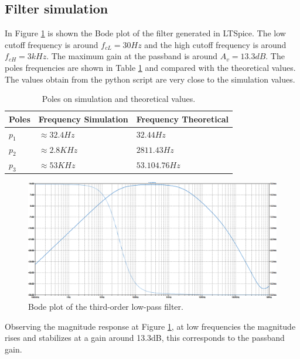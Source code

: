 \subsection{Filter simulation}
In Figure \ref{fig:ex2_bode} is shown the Bode plot of the filter generated in LTSpice. The low cutoff frequency is around $f_{cL} = 30Hz$ and the high cutoff frequency is around $f_{cH} = 3kHz$. The maximum gain at the passband is around $A_{v} = 13.3dB$. The poles frequencies are shown in Table \ref{tab:poles} and compared with the theoretical values. The values obtain from the python script are very close to the simulation values.

\begin{table}[h]
    \centering
    \caption{Poles on simulation and theoretical values.}
    \begin{tabularx}{\textwidth}{>{\centering\arraybackslash}X >{\centering\arraybackslash}X >{\centering\arraybackslash}X}
        \toprule
        \textbf{Poles} & \textbf{Frequency Simulation} & \textbf{Frequency Theoretical}\\
        \midrule
        $p_1$ & $\approx 32.4Hz$ & $32.44 Hz$ \\
        \midrule
        $p_2$ &  $\approx 2.8KHz$ & $2811.43 Hz$ \\
        \midrule
        $p_3$ & $\approx 53KHz$ & $53.104.76 Hz$ \\
        \bottomrule
    \end{tabularx}
    \label{tab:poles}
\end{table}

\begin{figure}[H]
    \centering
    \includegraphics[width=1\linewidth]{images/bode_ex2_ltspice.png}
    \caption{Bode plot of the third-order low-pass filter.}
    \label{fig:ex2_bode}
\end{figure}

Observing the magnitude response at Figure \ref{fig:ex2_bode}, at low frequencies the magnitude rises and stabilizes at a gain around 13.3dB, this corresponds to the passband gain.

